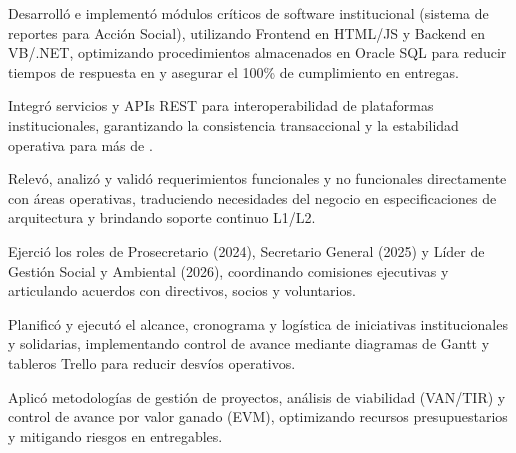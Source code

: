 
\begin{cvitems}
    \item Desarrolló e implementó módulos críticos de software institucional (sistema de reportes para Acción Social), utilizando Frontend en HTML/JS y Backend en VB/.NET, optimizando procedimientos almacenados en Oracle SQL para reducir tiempos de respuesta en \metric{[X\%]} y asegurar el 100\% de cumplimiento en entregas.
    \item Integró servicios y APIs REST para interoperabilidad de plataformas institucionales, garantizando la consistencia transaccional y la estabilidad operativa para más de \metric{[X usuarios]}.
    \item Relevó, analizó y validó requerimientos funcionales y no funcionales directamente con áreas operativas, traduciendo necesidades del negocio en especificaciones de arquitectura y brindando soporte continuo L1/L2.
\end{cvitems}

\begin{cvitems}
    \item Ejerció los roles de Prosecretario (2024), Secretario General (2025) y Líder de Gestión Social y Ambiental (2026), coordinando comisiones ejecutivas y articulando acuerdos con directivos, socios y voluntarios.
    \item Planificó y ejecutó el alcance, cronograma y logística de iniciativas institucionales y solidarias, implementando control de avance mediante diagramas de Gantt y tableros Trello para reducir desvíos operativos.
    \item Aplicó metodologías de gestión de proyectos, análisis de viabilidad (VAN/TIR) y control de avance por valor ganado (EVM), optimizando recursos presupuestarios y mitigando riesgos en entregables.
\end{cvitems}
